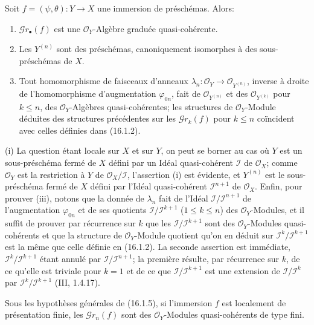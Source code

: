 \begin{proposition}[16.1.5]
Soit $f=(\psi,\theta):Y\to X$ une immersion de préschémas. Alors:
\begin{enumerate}
\item[(i)] $\mathscr{G}r_\bullet(f)$ est une $\mathcal{O}_Y$-Algèbre graduée
quasi-cohérente.
\item[(ii)] Les $Y^{(n)}$ sont des préschémas, canoniquement isomorphes à des
sous-préschémas de $X$.
\item[(iii)] Tout homomorphisme de faisceaux d'anneaux
$\lambda_n:\mathcal{O}_Y\to\mathcal{O}_{Y^{(n)}}$, inverse à droite de
l'homomorphisme d'augmentation $\varphi_{0n}$, fait de
$\mathcal{O}_{Y^{(n)}}$ et des $\mathcal{O}_{Y^{(k)}}$ pour $k\leq n$, des
$\mathcal{O}_Y$-Algèbres quasi-cohérentes; les structures de
$\mathcal{O}_Y$-Module déduites des structures précédentes sur les
$\mathscr{G}r_k(f)$ pour $k\leq n$ coïncident avec celles définies dans
(16.1.2).
\end{enumerate}
\end{proposition}

\noindent(i) La question étant locale sur $X$ et sur $Y$, on peut se borner au cas
où $Y$ est un sous-préschéma fermé de $X$ défini par un Idéal quasi-cohérent
$\mathscr{I}$ de $\mathcal{O}_X$; comme $\mathcal{O}_Y$ est la restriction à
$Y$ de $\mathcal{O}_X/\mathscr{I}$, l'assertion (i) est évidente, et $Y^{(n)}$
est le sous-préschéma fermé de $X$ défini par l'Idéal quasi-cohérent
$\mathscr{I}^{n+1}$ de $\mathcal{O}_X$. Enfin, pour prouver (iii), notons que la
donnée de $\lambda_n$ fait de l'Idéal
$\mathscr{I}/\mathscr{I}^{n+1}$ de l'augmentation $\varphi_{0n}$ et de ses
quotients $\mathscr{I}/\mathscr{I}^{k+1}$ ($1\leq k\leq n$) des
$\mathcal{O}_Y$-Modules, et il suffit de prouver par récurrence sur $k$ que les
$\mathscr{I}/\mathscr{I}^{k+1}$ sont des $\mathcal{O}_Y$-Modules
quasi-cohérents et que la structure de $\mathcal{O}_Y$-Module quotient qu'on en
déduit sur $\mathscr{I}^k/\mathscr{I}^{k+1}$ est la même que celle définie en
(16.1.2). La seconde assertion est immédiate,
$\mathscr{I}^k/\mathscr{I}^{k+1}$ étant annulé par
$\mathscr{I}/\mathscr{I}^{n+1}$; la première résulte, par récurrence sur $k$,
de ce qu'elle est triviale pour $k=1$ et de ce que
$\mathscr{I}/\mathscr{I}^{k+1}$ est une extension de
$\mathscr{I}/\mathscr{I}^k$ par
$\mathscr{I}^k/\mathscr{I}^{k+1}$ (III, 1.4.17).

\begin{corollary}[16.1.6]
\label{IV.16.1.6}
Sous les hypothèses générales de (16.1.5), si l'immersion $f$ est localement de
présentation finie, les $\mathscr{G}r_n(f)$ sont des $\mathcal{O}_Y$-Modules
quasi-cohérents de type fini.
\end{corollary}


